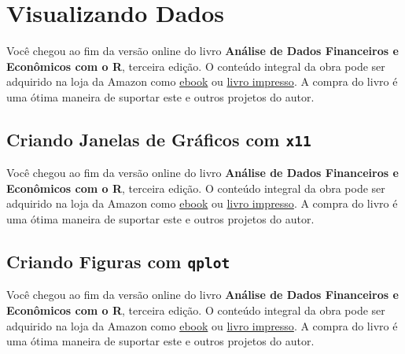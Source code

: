\documentclass[
  11pt,
]{book}
\newenvironment{pleasebuyit}
{\begin{noteblock}
		
	} {\end{noteblock}}
\begin{document}
\hypertarget{figuras}{%
\chapter{Visualizando Dados}\label{figuras}}

\begin{pleasebuyit}
Você chegou ao fim da versão online do livro \textbf{Análise de Dados
Financeiros e Econômicos com o R}, terceira edição. O conteúdo integral
da obra pode ser adquirido na loja da Amazon como
\href{https://www.amazon.com.br/dp/B08WNC27ZY}{ebook} ou
\href{https://www.amazon.com/dp/B08WP8CCDB}{livro impresso}. A compra do
livro é uma ótima maneira de suportar este e outros projetos do autor.
\end{pleasebuyit}

\hypertarget{criando-janelas-de-gruxe1ficos-com-x11}{%
\section{\texorpdfstring{Criando Janelas de Gráficos com \texttt{x11}}{Criando Janelas de Gráficos com x11}}\label{criando-janelas-de-gruxe1ficos-com-x11}}

\begin{pleasebuyit}
Você chegou ao fim da versão online do livro \textbf{Análise de Dados
Financeiros e Econômicos com o R}, terceira edição. O conteúdo integral
da obra pode ser adquirido na loja da Amazon como
\href{https://www.amazon.com.br/dp/B08WNC27ZY}{ebook} ou
\href{https://www.amazon.com/dp/B08WP8CCDB}{livro impresso}. A compra do
livro é uma ótima maneira de suportar este e outros projetos do autor.
\end{pleasebuyit}

\hypertarget{criando-figuras-com-qplot}{%
\section{\texorpdfstring{Criando Figuras com \texttt{qplot}}{Criando Figuras com qplot}}\label{criando-figuras-com-qplot}}

\begin{pleasebuyit}
Você chegou ao fim da versão online do livro \textbf{Análise de Dados
Financeiros e Econômicos com o R}, terceira edição. O conteúdo integral
da obra pode ser adquirido na loja da Amazon como
\href{https://www.amazon.com.br/dp/B08WNC27ZY}{ebook} ou
\href{https://www.amazon.com/dp/B08WP8CCDB}{livro impresso}. A compra do
livro é uma ótima maneira de suportar este e outros projetos do autor.
\end{pleasebuyit}
\end{document}
